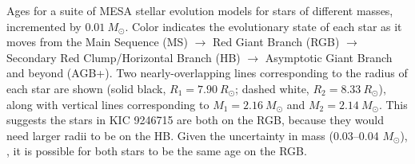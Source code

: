 \label{fig:mesa} Ages for a suite of MESA stellar evolution models for stars of different masses, incremented by $0.01 \ M_\odot$. Color indicates the evolutionary state of each star as it moves from the Main Sequence (MS) $\rightarrow$ Red Giant Branch (RGB) $\rightarrow$ Secondary Red Clump/Horizontal Branch (HB) $\rightarrow$ Asymptotic Giant Branch and beyond (AGB+). Two nearly-overlapping lines corresponding to the radius of each star are shown (solid black, $R_1 = 7.90 \ R_\odot$; dashed white, $R_2 = 8.33 \ R_\odot$), along with vertical lines corresponding to $M_1 = 2.16 \ M_\odot$ and $M_2 = 2.14 \ M_\odot$. This suggests the stars in KIC 9246715 are both on the RGB, because they would need larger radii to be on the HB. Given the uncertainty in mass (0.03--0.04 $M_\odot$), , it is possible for both stars to be the same age on the RGB.

  
  
  